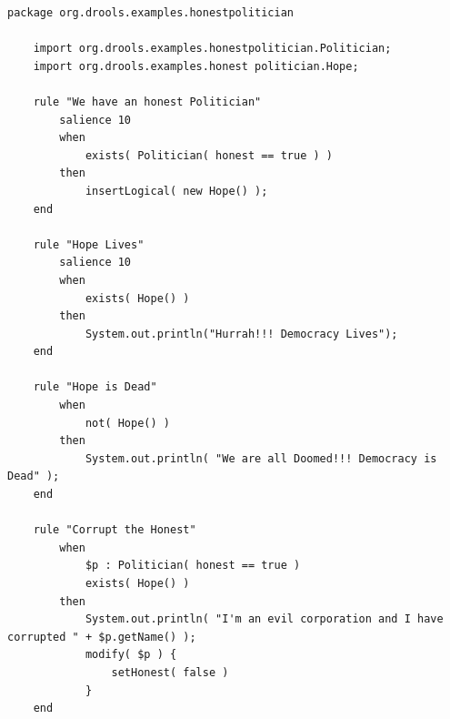 \begin{lstlisting}[language={[drl]Drools}, caption=Example Drools file., captionpos=b, label=listing:drl_file]
    package org.drools.examples.honestpolitician
 
    import org.drools.examples.honestpolitician.Politician;
    import org.drools.examples.honest politician.Hope;
     
    rule "We have an honest Politician"
        salience 10
        when
            exists( Politician( honest == true ) )
        then
            insertLogical( new Hope() );
    end
    
    rule "Hope Lives"
        salience 10
        when
            exists( Hope() )
        then
            System.out.println("Hurrah!!! Democracy Lives");
    end
    
    rule "Hope is Dead"
        when
            not( Hope() )
        then
            System.out.println( "We are all Doomed!!! Democracy is Dead" );
    end
    
    rule "Corrupt the Honest"
        when
            $p : Politician( honest == true )   
            exists( Hope() )
        then
            System.out.println( "I'm an evil corporation and I have corrupted " + $p.getName() );
            modify( $p ) { 
                setHonest( false ) 
            }
    end
\end{lstlisting}


